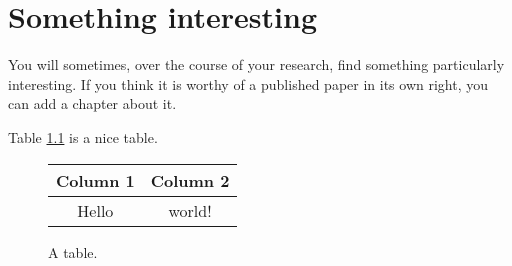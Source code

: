 \chapter{Something interesting}
You will sometimes, over the course of your research, find something
particularly interesting. If you think it is worthy of a published paper in
its own right, you can add a chapter about it.

\lipsum[25]

Table \ref{table:mytable} is a nice table.

\lipsum[30]

\begin{figure}
  \centering
  \begin{tabular}{cc}
    \toprule
    Column 1 & Column 2 \\
    \midrule
    Hello & world! \\
    \bottomrule
  \end{tabular}
  \caption{A table.}
  \label{table:mytable}
\end{figure}


\lipsum[20-25]